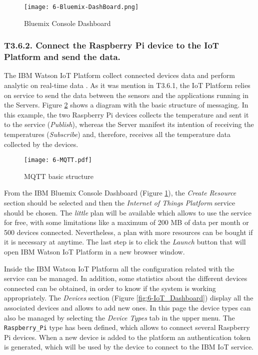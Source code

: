 \begin{figure}[!h]
	\begin{center}
		\texttt{[image: 6-Bluemix-DashBoard.png]}
		\caption{Bluemix Console Dashboard}
		\label{fig:6-Bluemix-DashBoard}
	\end{center}
\end{figure}


\subsubsection{T3.6.2. Connect the Raspberry Pi device to the IoT Platform and send the data.}

The IBM Watson \ac{IoT} Platform collect connected devices data and perform analytic on real-time data \cite{IBMIoT}. As it was mention in T3.6.1, the \ac{IoT} Platform relies on  service to send the data between the sensors and the applications running in the Servers. Figure \ref{fig:6-MQTT} shows a diagram with the basic structure of  messaging. In this example, the two Raspberry Pi devices collects the temperature and sent it to the  service (\emph{Publish}), whereas the Server manifest its intention of receiving the temperatures (\emph{Subscribe}) and, therefore, receives all the temperature data collected by the devices.

\begin{figure}[!h]
	\begin{center}
		\texttt{[image: 6-MQTT.pdf]}
		\caption{MQTT basic structure}
		\label{fig:6-MQTT}
	\end{center}
\end{figure}

From the IBM Bluemix Console Dashboard (Figure \ref{fig:6-Bluemix-DashBoard}), the \emph{Create Resource} section should be selected and then the \emph{Internet of Things Platform} service should be chosen. The \emph{little} plan will be available which allows to use the service for free, with some limitations like a maximum of 200 MB of data per month or 500 devices connected. Nevertheless, a plan with more resources can be bought if it is necessary at anytime. The last step is to click the \textit{Launch} button that will open IBM Watson \ac{IoT} Platform in a new browser window.

Inside the IBM Watson \ac{IoT} Platform all the configuration related with the service can be managed. In addition, some statistics about the different devices connected can be obtained, in order to know if the system is working appropriately. The \textit{Devices} section (Figure \ref{fig:6-IoT_Dashboard}) display all the associated devices and allows to add new ones. In this page the device types can also be managed by selecting the \textit{Device Types} tab in the upper menu. The \texttt{Raspberry\_Pi} type has been defined, which allows to connect several Raspberry Pi devices. When a new device is added to the platform an authentication token is generated, which will be used by the device to connect to the IBM \ac{IoT} service. 

